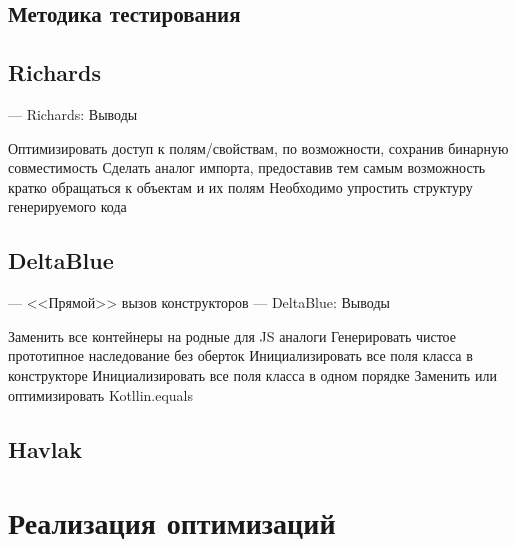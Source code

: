 \subsection{Методика тестирования}

\subsection{Richards}
---
Richards: Выводы

Оптимизировать доступ к полям/свойствам, по возможности, сохранив бинарную совместимость
Сделать аналог импорта, предоставив тем самым возможность кратко обращаться к объектам и их полям
Необходимо упростить структуру генерируемого кода

\subsection{DeltaBlue}

---
<<Прямой>> вызов конструкторов
---
DeltaBlue: Выводы

Заменить все контейнеры на родные для JS аналоги
Генерировать чистое прототипное наследование без оберток
Инициализировать все поля класса в конструкторе
Инициализировать все поля класса в одном порядке
Заменить или оптимизировать Kotllin.equals

\subsection{Havlak}
\section {Реализация оптимизаций}